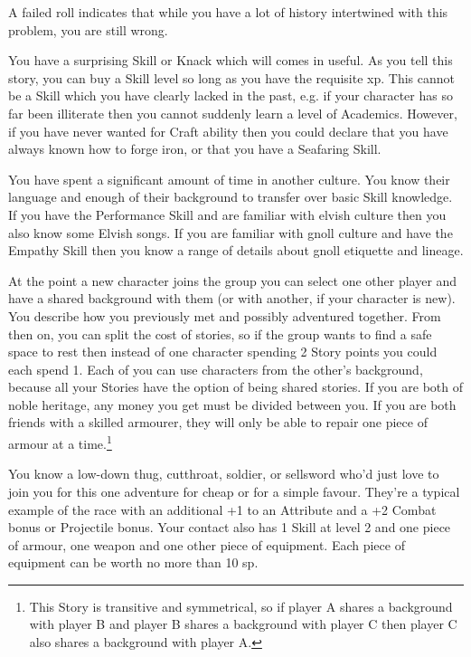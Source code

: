 \documentclass[titlepage,a4paper,openany]{book}
\begin{document}
\begin{multicols}{2}
A failed roll indicates that while you have a lot of history intertwined with this problem, you are still wrong.

You have a surprising Skill or Knack which will comes in useful. As you tell this story, you can buy a Skill level so long as you have the requisite \gls{xp}. This cannot be a Skill which you have clearly lacked in the past, e.g. if your character has so far been illiterate then you cannot suddenly learn a level of Academics. However, if you have never wanted for Craft ability then you could declare that you have always known how to forge iron, or that you have a Seafaring Skill.

You have spent a significant amount of time in another culture. You know their language and enough of their background to transfer over basic Skill knowledge. If you have the Performance Skill and are familiar with elvish culture then you also know some Elvish songs. If you are familiar with gnoll culture and have the Empathy Skill then you know a range of details about gnoll etiquette and lineage.

At the point a new character joins the group you can select one other player and have a shared background with them (or with another, if your character is new). You describe how you previously met and possibly adventured together. From then on, you can split the cost of stories, so if the group wants to find a safe space to rest then instead of one character spending 2 Story points you could each spend 1. Each of you can use characters from the other's background, because all your Stories have the option of being shared stories. If you are both of noble heritage, any money you get must be divided between you. If you are both friends with a skilled armourer, they will only be able to repair one piece of armour at a time.\footnote{This Story is transitive and symmetrical, so if player A shares a background with player B and player B shares a background with player C then player C also shares a background with player A.}

You know a low-down thug, cutthroat, soldier, or sellsword who'd just love to join you for this one adventure for cheap or for a simple favour. They're a typical example of the race with an additional +1 to an Attribute and a +2 Combat bonus or Projectile bonus. Your contact also has 1 Skill at level 2 and one piece of armour, one weapon and one other piece of equipment. Each piece of equipment can be worth no more than 10 \gls{sp}.


\end{multicols}
\end{document}
